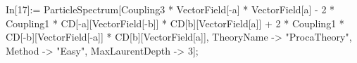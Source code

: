 In[17]:= ParticleSpectrum[Coupling3 * VectorField[-a] * VectorField[a] - 2 * Coupling1 * CD[-a][VectorField[-b]] * CD[b][VectorField[a]] + 2 * Coupling1 * CD[-b][VectorField[-a]] * CD[b][VectorField[a]], TheoryName -> "ProcaTheory", Method -> "Easy", MaxLaurentDepth -> 3]; 